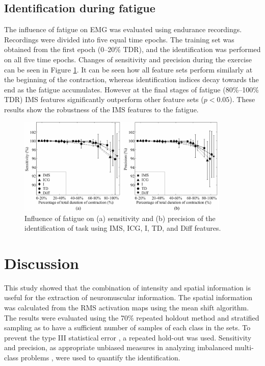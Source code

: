 \subsection{Identification during fatigue}
The influence of fatigue on EMG was evaluated using endurance recordings. Recordings were divided into five equal time epochs. The training set was obtained from the first epoch (0–20\% TDR), and the identification was performed on all five time epochs.
Changes of sensitivity and precision during the exercise can be seen in Figure \ref{fig:3-11}. It can be seen how all feature sets perform similarly at the beginning of the contraction, whereas identification indices decay towards the end as the fatigue accumulates. However at the final stages of fatigue (80\%–100\% TDR) IMS features significantly outperform other feature sets ($p < 0.05$). These results show the robustness of the IMS features to the fatigue.

\begin{figure}[ht]
\centering
\includegraphics[width=0.9\textwidth]{Images/figure3_11.png}
\caption{Influence of fatigue on (a) sensitivity and (b) precision of the identification of task using IMS, ICG, I, TD, and Diff features.}
\label{fig:3-11}
\end{figure}   
\clearpage

\section{Discussion} \label{sc:3-4}
This study showed that the combination of intensity and spatial information is useful for the extraction of neuromuscular information. The spatial information was calculated from the RMS activation maps using the mean shift algorithm. The results were evaluated using the 70\% repeated holdout method and stratified sampling as to have a sufficient number of samples of each class in the sets. To prevent the type III statistical error \citep{Mosteller1948, Mohebian2017}, a repeated hold-out was used. Sensitivity and precision, as appropriate unbiased measures in analyzing imbalanced multi-class problems \citep{Jordanic2016b, Rojas-Martinez2013}, were used to quantify the identification.

